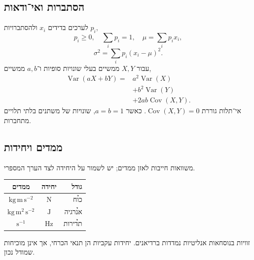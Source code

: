 \begin{referencecolumns}
\begin{referenceentry}
\section{הסתברות ואי־ודאות}
לערכים בדידים $x_i$ ולהסתברויות $p_i$,
\[
p_i\geq0,\quad\sum_i p_i=1,\quad\mu=\sum_i p_i x_i,
\]
\[
\sigma^2=\sum_i p_i(x_i-\mu)^2.
\]
עבור $X,Y$ ממשיים בעלי שונויות סופיות ו־$a,b$ ממשיים,
\[
\begin{aligned}
\operatorname{Var}(aX+bY)
={}&a^2\operatorname{Var}(X)\\
 &+b^2\operatorname{Var}(Y)\\
 &+2ab\operatorname{Cov}(X,Y).
\end{aligned}
\]
אי־תלות גוררת $\operatorname{Cov}(X,Y)=0$. כאשר $a=b=1$, שונויות
של משתנים בלתי תלויים מתחברות.
\end{referenceentry}

\begin{referenceentry}
\section{ממדים ויחידות}
משוואות חייבות לאזן ממדים; יש לשמור על היחידה לצד הערך המספרי.
\begin{referencetable}
\centering
\setlength{\arrayrulewidth}{0.4pt}
\setlength{\tabcolsep}{4pt}
\renewcommand{\arraystretch}{1.05}
\begin{otherlanguage}{english}
\begin{tabular}{|c|c|r|}
\hline
\rowcolor{black!10}
\h{\textbf{ממדים}} & \h{\textbf{יחידה}} & \h{\textbf{גודל}}\\\hline
$\mathrm{kg\,m\,s^{-2}}$ & $\mathrm N$ & \h{כוח}\\\hline
$\mathrm{kg\,m^2\,s^{-2}}$ & $\mathrm J$ & \h{אנרגיה}\\\hline
$\mathrm{s^{-1}}$ & $\mathrm{Hz}$ & \h{תדירות}\\\hline
\end{tabular}
\end{otherlanguage}
\end{referencetable}
זוויות בנוסחאות אנליטיות נמדדות ברדיאנים. יחידות עקביות הן תנאי
הכרחי, אך אינן מוכיחות שמודל נכון.
\end{referenceentry}

\begin{referenceentry}

\end{referenceentry}
\end{referencecolumns}
